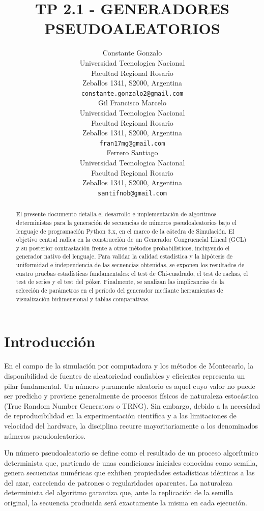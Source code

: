 \documentclass{article}
\title{TP 2.1 - GENERADORES PSEUDOALEATORIOS}
\author{
 Constante Gonzalo \\
  Universidad Tecnologica Nacional\\
  Facultad Regional Rosario\\
Zeballos 1341, S2000, Argentina 
\\
  \texttt{constante.gonzalo2@gmail.com} \\
   \And
 Gil Francisco Marcelo\\
  Universidad Tecnologica Nacional\\
  Facultad Regional Rosario\\
Zeballos 1341, S2000, Argentina 
 \\
  \texttt{fran17mg@gmail.com} \\
  \And
 Ferrero Santiago\\
  Universidad Tecnologica Nacional\\
  Facultad Regional Rosario\\
Zeballos 1341, S2000, Argentina 
\\
  \texttt{santifnob@gmail.com} \\
}
\begin{document}
\maketitle

\begin{abstract}
El presente documento detalla el desarrollo e implementación de algoritmos deterministas para la generación de secuencias de números pseudoaleatorios bajo el lenguaje de programación Python 3.x, en el marco de la cátedra de Simulación. El objetivo central radica en la construcción de un Generador Congruencial Lineal (GCL) y su posterior contrastación frente a otros métodos probabilísticos, incluyendo el generador nativo del lenguaje. Para validar la calidad estadística y la hipótesis de uniformidad e independencia de las secuencias obtenidas, se exponen los resultados de cuatro pruebas estadísticas fundamentales: el test de Chi-cuadrado, el test de rachas, el test de series y el test del póker. Finalmente, se analizan las implicancias de la selección de parámetros en el período del generador mediante herramientas de visualización bidimensional y tablas comparativas.
\end{abstract}


\newpage

\section{Introducción}

En el campo de la simulación por computadora y los métodos de Montecarlo, la disponibilidad de fuentes de aleatoriedad confiables y eficientes representa un pilar fundamental. Un número puramente aleatorio es aquel cuyo valor no puede ser predicho y proviene generalmente de procesos físicos de naturaleza estocástica (True Random Number Generators o TRNG). Sin embargo, debido a la necesidad de reproducibilidad en la experimentación científica y a las limitaciones de velocidad del hardware, la disciplina recurre mayoritariamente a los denominados números pseudoaleatorios.

Un número pseudoaleatorio se define como el resultado de un proceso algorítmico determinista que, partiendo de unas condiciones iniciales conocidas como semilla, genera secuencias numéricas que exhiben propiedades estadísticas idénticas a las del azar, careciendo de patrones o regularidades aparentes. La naturaleza determinista del algoritmo garantiza que, ante la replicación de la semilla original, la secuencia producida será exactamente la misma en cada ejecución.
\end{document}
